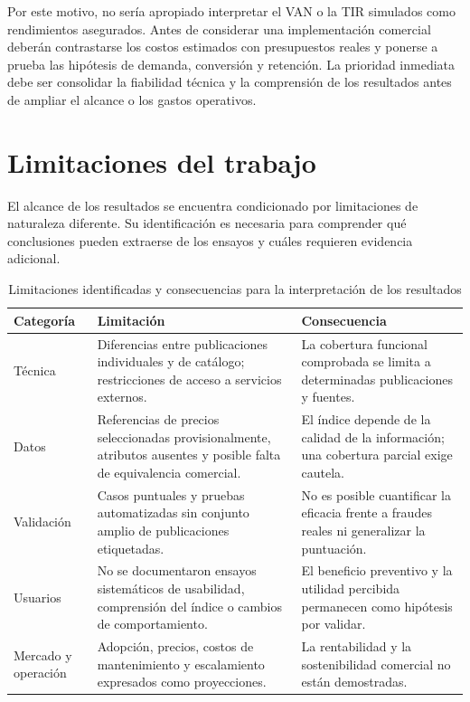 Por este motivo, no sería apropiado interpretar el VAN o la TIR simulados como rendimientos asegurados. Antes de considerar una implementación comercial deberán contrastarse los costos estimados con presupuestos reales y ponerse a prueba las hipótesis de demanda, conversión y retención. La prioridad inmediata debe ser consolidar la fiabilidad técnica y la comprensión de los resultados antes de ampliar el alcance o los gastos operativos.

\section{Limitaciones del trabajo}\label{sec:ml-limitaciones-conclusiones}

El alcance de los resultados se encuentra condicionado por limitaciones de naturaleza diferente. Su identificación es necesaria para comprender qué conclusiones pueden extraerse de los ensayos y cuáles requieren evidencia adicional.

\begin{table}[htbp]
    \centering
    \caption{Limitaciones identificadas y consecuencias para la interpretación de los resultados}
    \label{tab:ml-limitaciones-conclusiones}
    \small
    \begin{tabularx}{\textwidth}{@{}p{2.2cm} X X@{}}
        \toprule
        \textbf{Categoría} & \textbf{Limitación} & \textbf{Consecuencia} \\
        \midrule
        Técnica & Diferencias entre publicaciones individuales y de catálogo; restricciones de acceso a servicios externos. & La cobertura funcional comprobada se limita a determinadas publicaciones y fuentes. \\
        Datos & Referencias de precios seleccionadas provisionalmente, atributos ausentes y posible falta de equivalencia comercial. & El índice depende de la calidad de la información; una cobertura parcial exige cautela. \\
        Validación & Casos puntuales y pruebas automatizadas sin conjunto amplio de publicaciones etiquetadas. & No es posible cuantificar la eficacia frente a fraudes reales ni generalizar la puntuación. \\
        Usuarios & No se documentaron ensayos sistemáticos de usabilidad, comprensión del índice o cambios de comportamiento. & El beneficio preventivo y la utilidad percibida permanecen como hipótesis por validar. \\
        Mercado y operación & Adopción, precios, costos de mantenimiento y escalamiento expresados como proyecciones. & La rentabilidad y la sostenibilidad comercial no están demostradas. \\
        \bottomrule
    \end{tabularx}
\end{table}

